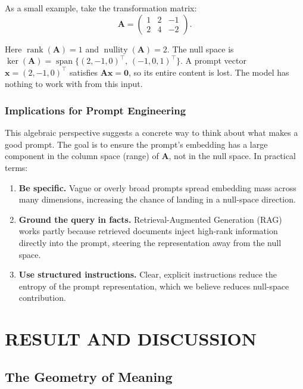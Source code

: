 \documentclass[12pt,a4paper]{article}
\begin{document}
As a small example, take the transformation matrix:
\begin{equation}
    \mathbf{A} =
    \begin{pmatrix}
        1 &  2 & -1 \\
        2 &  4 & -2
    \end{pmatrix}.
\end{equation}

Here $\operatorname{rank}(\mathbf{A}) = 1$ and $\operatorname{nullity}(\mathbf{A}) = 2$.
The null space is $\ker(\mathbf{A}) = \operatorname{span}\{(2,-1,0)^\top,\,(-1,0,1)^\top\}$.
A prompt vector $\mathbf{x} = (2,-1,0)^\top$ satisfies $\mathbf{A}\mathbf{x} = \mathbf{0}$,
so its entire content is lost. The model has nothing to work with from this input.

\subsubsection{Implications for Prompt Engineering}

This algebraic perspective suggests a concrete way to think about what makes a good prompt.
The goal is to ensure the prompt's embedding has a large component in the column space
(range) of $\mathbf{A}$, not in the null space. In practical terms:

\begin{enumerate}[label=\arabic*., itemsep=4pt]
    \item \textbf{Be specific.} Vague or overly broad prompts spread embedding mass across
          many dimensions, increasing the chance of landing in a null-space direction.
    \item \textbf{Ground the query in facts.} Retrieval-Augmented Generation (RAG) works
          partly because retrieved documents inject high-rank information directly into the
          prompt, steering the representation away from the null space.
    \item \textbf{Use structured instructions.} Clear, explicit instructions reduce the
          entropy of the prompt representation, which we believe reduces null-space
          contribution.
\end{enumerate}

\section{RESULT AND DISCUSSION}

\subsection{The Geometry of Meaning}
\end{document}
